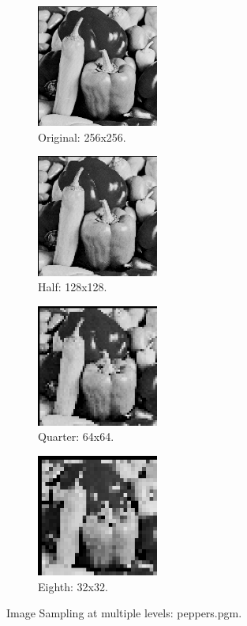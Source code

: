 \documentclass[letterpaper,10pt]{article}
\begin{document}
\begin{figure}[hbtp]
  \centering
  \begin{subfigure}{4cm}
    \includegraphics[width=4cm]{images/peppers.png}
    \caption{Original: 256x256.}
  \end{subfigure}
  \begin{subfigure}{4cm}
    \includegraphics[width=4cm]{images/peppers_subsample128.png}
    \caption{Half: 128x128.}
  \end{subfigure}
  \begin{subfigure}{4cm}
    \includegraphics[width=4cm]{images/peppers_subsample64.png}
    \caption{Quarter: 64x64.}
  \end{subfigure}
  \begin{subfigure}{4cm}
    \includegraphics[width=4cm]{images/peppers_subsample32.png}
    \caption{Eighth: 32x32.}
  \end{subfigure}
  \caption{Image Sampling at multiple levels: peppers.pgm.}
  \label{fig:samplepeppers}
\end{figure}
\end{document}
